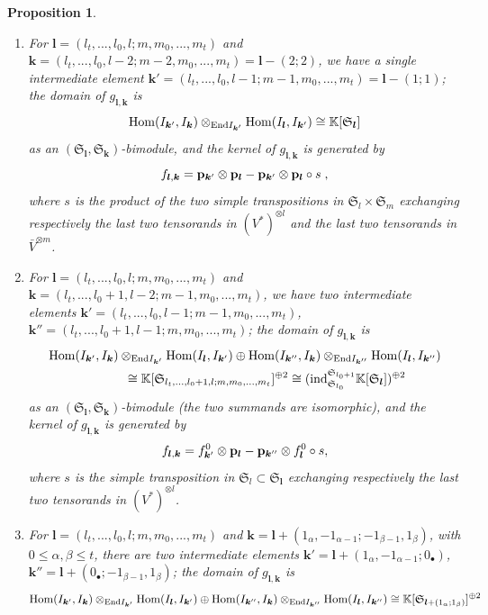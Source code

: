 \documentclass[12pt]{article}
\def\KK {{\mathbb K}}     %
\def\mk {\mathfrak}
\newtheorem{prop}[theorem]{Proposition}
\begin{document}
\begin{prop}
\begin{enumerate}
\item For $\bm l=(l_t,...,l_0,l;m,m_0,...,m_t)$ and $\bm k=(l_t,...,l_0,l-2;m-2,m_0,...,m_t)=\bm l-(2;2)$, we have a single intermediate element $\bm k'=(l_t,...,l_0,l-1;m-1,m_0,...,m_t)=\bm l-(1;1)$; the domain of $g_{\bm l,\bm k}$ is
$$
{\rm Hom}(I_{\bm k'},I_{\bm k})\otimes_{{\rm End}I_{\bm k'}}{\rm Hom}(I_{\bm l},I_{\bm k'}) \cong \KK[\mk S_{\bm l}]
$$
as an $(\mk S_{\bm l},\mk S_{\bm k})$-bimodule, and the kernel of $g_{\bm l,\bm k}$ is generated by
$$
f_{\bm l,\bm k}={\bf p}_{\bm k'}\otimes{\bf p}_{\bm l} - {\bf p}_{\bm k'}\otimes{\bf p}_{\bm l}\circ s \;,
$$
where $s$ is the product of the two simple transpositions in $\mk S_{l}\times \mk S_{m}$ exchanging respectively the last two tensorands in $(V^*)^{\otimes l}$ and the last two tensorands in $\bar V^{\otimes m}$.
\item For $\bm l=(l_t,...,l_0,l;m,m_0,...,m_t)$ and $\bm k=(l_t,...,l_0+1,l-2;m-1,m_0,...,m_t)$, we have two intermediate elements $\bm k'=(l_t,...,l_0,l-1;m-1,m_0,...,m_t)$, $\bm k''=(l_t,...,l_0+1,l-1;m,m_0,...,m_t)$; the domain of $g_{\bm l,\bm k}$ is
\begin{align*}
& {\rm Hom}(I_{\bm k'},I_{\bm k})\otimes_{{\rm End}I_{\bm k'}}{\rm Hom}(I_{\bm l},I_{\bm k'})\oplus {\rm Hom}(I_{\bm k''},I_{\bm k})\otimes_{{\rm End}I_{\bm k''}}{\rm Hom}(I_{\bm l},I_{\bm k''})\\
& \qquad\qquad\qquad \cong \KK[\mk S_{l_t,...,l_0+1,l;m,m_0,...,m_t}]^{\oplus 2}\cong ({\rm ind}^{\mk S_{l_0+1}}_{\mk S_{l_0}}\KK[\mk S_{\bm l}])^{\oplus 2}
\end{align*}
as an $(\mk S_{\bm l},\mk S_{\bm k})$-bimodule (the two summands are isomorphic), and the kernel of $g_{\bm l,\bm k}$ is generated by
$$
f_{\bm l,\bm k}= f^{0}_{\bm k'}\otimes{\bf p}_{\bm l} - {\bf p}_{\bm k''}\otimes f^{0}_{\bm l} \circ s ,
$$
where $s$ is the simple transposition in $\mk S_{l}\subset\mk S_{\bm l}$ exchanging respectively the last two tensorands in $(V^*)^{\otimes l}$.
\item For $\bm l=(l_t,...,l_0,l;m,m_0,...,m_t)$ and $\bm k=\bm l+(1_{\alpha},-1_{\alpha-1};-1_{\beta-1},1_{\beta})$, with $0\leq\alpha,\beta\leq t$, there are two intermediate elements $\bm k'=\bm l+(1_{\alpha},-1_{\alpha-1};0_\bullet)$, $\bm k''=\bm l+(0_\bullet;-1_{\beta-1},1_{\beta})$; the domain of $g_{\bm l,\bm k}$ is
$$
{\rm Hom}(I_{\bm k'},I_{\bm k})\otimes_{{\rm End}I_{\bm k'}}{\rm Hom}(I_{\bm l},I_{\bm k'})\oplus {\rm Hom}(I_{\bm k''},I_{\bm k})\otimes_{{\rm End}I_{\bm k''}}{\rm Hom}(I_{\bm l},I_{\bm k''}) \cong \KK[\mk S_{\bm l+(1_\alpha;1_{\beta})}]^{\oplus 2}
$$
\end{enumerate}
\end{prop}
\end{document}
